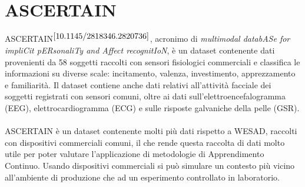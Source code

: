 \section{ASCERTAIN}
ASCERTAIN$^{\cite{10.1145/2818346.2820736}}$, acronimo di \textit{multimodal databASe for impliCit pERsonaliTy and Affect recognitIoN}, è un dataset contenente dati provenienti da 58 soggetti raccolti con sensori fisiologici commerciali e classifica le informazioni su diverse scale: incitamento, valenza, investimento, apprezzamento e familiarità. Il dataset contiene anche dati relativi all'attività facciale dei soggetti registrati con sensori comuni, oltre ai dati sull'elettroencefalogramma (EEG), elettrocardiogramma (ECG) e sulle risposte galvaniche della pelle (GSR).\\\\
ASCERTAIN è un dataset contenente molti più dati rispetto a WESAD, raccolti con dispositivi commerciali comuni, il che rende questa raccolta di dati molto utile per poter valutare l'applicazione di metodologie di Apprendimento Continuo. Usando dispositivi commerciali si può simulare un contesto più vicino all'ambiente di produzione che ad un esperimento controllato in laboratorio.
